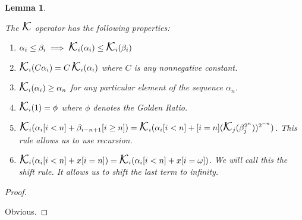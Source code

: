 \documentclass[
]{article}
\providecommand{\tightlist}{%
  \setlength{\itemsep}{0pt}\setlength{\parskip}{0pt}}
\DeclareMathOperator*{\kap}{\text{\Large{$\mathcal K$}}}
\theoremstyle{theorem}
\theoremstyle{lemma}
\newtheorem{lemma}{Lemma}
\theoremstyle{corollary}
\theoremstyle{remark}
\theoremstyle{definition}
\begin{document}
\begin{lemma}
\hypertarget{lemma-6}{%
\label{lemma-6}}


The \(\kap\) operator has the following properties:

\begin{enumerate}
\def\labelenumi{\arabic{enumi}.}
\tightlist
\item
  \(\alpha_i \leq \beta_i \implies \kap_i(\alpha_i) \leq \kap_i(\beta_i)\)
\item
  \(\kap_i(C\alpha_i) = C\kap_i(\alpha_i)\) where \(C\) is any nonnegative constant.
\item
  \(\kap_i(\alpha_i) \geq \alpha_n\) for any particular element of the sequence \(\alpha_n\).
\item
  \(\kap_i(1) = \phi\) where \(\phi\) denotes the Golden Ratio.
\item
  \(\kap_i(\alpha_i[i < n] + \beta_{i - n + 1}[i \geq n]) = \kap_i(\alpha_i[i < n] + [i = n](\kap_j(\beta_j^{2^n}))^{2^{-n}})\). This rule allows us to use recursion.
\item
  \(\kap_i(\alpha_i[i < n] + x[i=n]) = \kap_i(\alpha_i[i < n] + x[i=\omega])\). We will call this the \emph{shift rule}. It allows us to shift the last term to infinity.
\end{enumerate}

\end{lemma}
\begin{proof}

\hypertarget{proof-6}{%
\label{proof-6}}
Obvious.
\end{proof}
\end{document}
